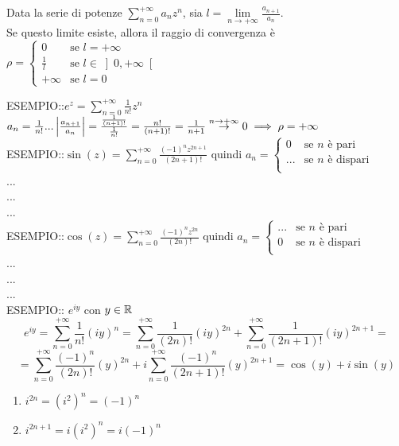 \begin{proposition}
	Data la serie di potenze $\sum\limits_{n=0}^{+\infty}a_nz^n$, sia $l=\lim\limits_{n\to+\infty}\frac{a_{n+1}}{a_n}$.\\
	Se questo limite esiste, allora il raggio di convergenza è
	$\rho =
	\begin{cases}
	0				&	\text{se }l=+\infty\\
	\frac{1}{l} 	&	\text{se }l\in\left]0,+\infty\right[\\
	+\infty 		& 	\text{se }l=0
	\end{cases}
	$
\end{proposition}
ESEMPIO::$e^z=\sum\limits_{n=0}^{+\infty}\frac{1}{n!}z^n$\\
$a_n=\frac{1}{n!} ...  \left|\frac{a_{n+1}}{a_n}\right|=\frac{\frac{1}{(n+1)!}}{\frac{1}{n!}}=\frac{n!}{(n+1)!}=\frac{1}{n+1}\overset{n\to+\infty}{\to}0 \implies \rho=+\infty$\\
ESEMPIO::$\sin(z)=\sum\limits_{n=0}^{+\infty}\frac{(-1)^nz^{2n+1}}{(2n+1)!}$ quindi
$a_n =
\begin{cases}
0		&	\text{se }n\text{ è pari}\\
...		&	\text{se }n\text{ è dispari}\\
\end{cases}
$\\
...\\
...\\
...\\
ESEMPIO::$\cos(z)=\sum\limits_{n=0}^{+\infty}\frac{(-1)^nz^{2n}}{(2n)!}$ quindi
$a_n =
\begin{cases}
...		&	\text{se }n\text{ è pari}\\
0		&	\text{se }n\text{ è dispari}\\
\end{cases}
$\\
...\\
...\\
...\\
ESEMPIO:: $e^{iy}$ con $y\in \mathbb{R}$
\[e^{iy} = \sum\limits_{n=0}^{+\infty}\frac{1}{n!}(iy)^n = \sum\limits_{n=0}^{+\infty}\frac{1}{(2n)!}(iy)^{2n} + \sum\limits_{n=0}^{+\infty}\frac{1}{(2n+1)!}(iy)^{2n+1} = \]
\[ = \sum\limits_{n=0}^{+\infty}\frac{(-1)^n}{(2n)!}(y)^{2n} + i\sum\limits_{n=0}^{+\infty}\frac{(-1)^n}{(2n+1)!}(y)^{2n+1} = \cos(y)+i \sin(y)\]
\begin{enumerate}
	\item $i^{2n}=\left(i^2\right)^n=(-1)^n$
	\item $i^{2n+1}=i\left(i^2\right)^n=i(-1)^n$
\end{enumerate}

